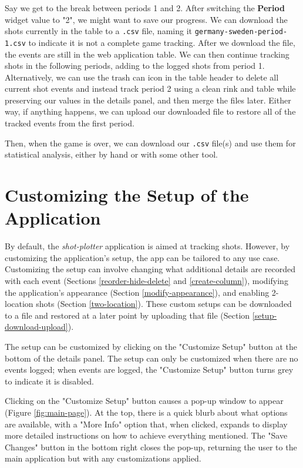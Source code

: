 \documentclass[letterpaper]{article}
\begin{document}
Say we get to the break between periods 1 and 2. After switching the \textbf{Period} widget value to "2", we might want to save our progress. We can download the shots currently in the table to a \texttt{.csv} file, naming it \texttt{germany-sweden-period-1.csv} to indicate it is not a complete game tracking. After we download the file, the events are still in the web application table. We can then continue tracking shots in the following periods, adding to the logged shots from period 1. Alternatively, we can use the trash can icon in the table header to delete all current shot events and instead track period 2 using a clean rink and table while preserving our values in the details panel, and then merge the files later. Either way, if anything happens, we can upload our downloaded file to restore all of the tracked events from the first period.

Then, when the game is over, we can download our \texttt{.csv} file(s) and use them for statistical analysis, either by hand or with some other tool.

\section{Customizing the Setup of the Application}
By default, the \textit{shot-plotter} application is aimed at tracking shots. However, by customizing the application's setup, the app can be tailored to any use case. Customizing the setup can involve changing what additional details are recorded with each event (Sections \ref{reorder-hide-delete} and \ref{create-column}), modifying the application's appearance (Section \ref{modify-appearance}), and enabling 2-location shots (Section \ref{two-location}). These custom setups can be downloaded to a file and restored at a later point by uploading that file (Section \ref{setup-download-upload}).

The setup can be customized by clicking on the "Customize Setup" button at the bottom of the details panel. The setup can only be customized when there are no events logged; when events are logged, the "Customize Setup" button turns grey to indicate it is disabled.

Clicking on the "Customize Setup" button causes a pop-up window to appear (Figure \ref{fig:main-page}). At the top, there is a quick blurb about what options are available, with a "More Info" option that, when clicked, expands to display more detailed instructions on how to achieve everything mentioned. The "Save Changes" button in the bottom right closes the pop-up, returning the user to the main application but with any customizations applied.
\end{document}
